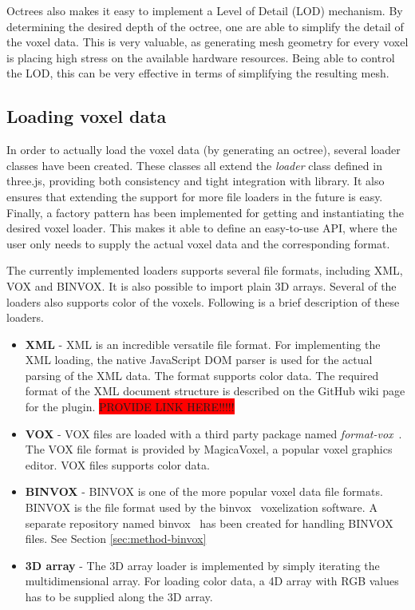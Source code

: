 Octrees also makes it easy to implement a Level of Detail (LOD) mechanism. By determining the desired depth of the octree, one are able to simplify the detail of the voxel data. This is very valuable, as generating mesh geometry for every voxel is placing high stress on the available hardware resources. Being able to control the LOD, this can be very effective in terms of simplifying the resulting mesh.

\subsection{Loading voxel data}
In order to actually load the voxel data (by generating an octree), several loader classes have been created. These classes all extend the \textit{loader} class defined in three.js, providing both consistency and tight integration with library. It also ensures that extending the support for more file loaders in the future is easy. Finally, a factory pattern has been implemented for getting and instantiating the desired voxel loader. This makes it able to define an easy-to-use API, where the user only needs to supply the actual voxel data and the corresponding format.

The currently implemented loaders supports several file formats, including XML, VOX and BINVOX. It is also possible to import plain 3D arrays. Several of the loaders also supports color of the voxels. Following is a brief description of these loaders.
\begin{itemize}
    \item \textbf{XML} - XML is an incredible versatile file format. For implementing the XML loading, the native JavaScript DOM parser is used for the actual parsing of the XML data. The format supports color data. The required format of the XML document structure is described on the GitHub wiki page for the plugin. \colorbox{red}{PROVIDE LINK HERE!!!!!}
    \item \textbf{VOX} - VOX files are loaded with a third party package named \textit{format-vox}~\cite{format-vox}. The VOX file format is provided by MagicaVoxel, a popular voxel graphics editor. VOX files supports color data.
    \item \textbf{BINVOX} - BINVOX \cite{binvox-file-format} is one of the more popular voxel data file formats. BINVOX is the file format used by the binvox~\cite{binvox} voxelization software. A separate repository named binvox~\cite{andstor-binvox} has been created for handling BINVOX files. See Section \ref{sec:method-binvox}
    \item \textbf{3D array} - The 3D array loader is implemented by simply iterating the multidimensional array. For loading color data, a 4D array with RGB values has to be supplied along the 3D array.
\end{itemize}

